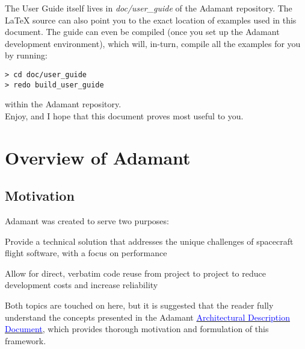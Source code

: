 The User Guide itself lives in \textit{doc/user\_guide} of the Adamant repository. The \LaTeX{} source can also point you to the exact location of examples used in this document. The guide can even be compiled (once you set up the Adamant development environment), which will, in-turn, compile all the examples for you by running:

\vspace{5mm} %
\begin{verbatim}
> cd doc/user_guide
> redo build_user_guide
\end{verbatim}
\vspace{5mm} %

within the Adamant repository. \\

Enjoy, and I hope that this document proves most useful to you.

\newpage
\section{Overview of Adamant}

\subsection{Motivation}

Adamant was created to serve two purposes: 

\vspace{1mm} %
\begin{spacedenumerate}
  \item Provide a technical solution that addresses the unique challenges of spacecraft flight software, with a focus on performance
  \item Allow for direct, verbatim code reuse from project to project to reduce development costs and increase reliability
\end{spacedenumerate}
\vspace{1mm} %

Both topics are touched on here, but it is suggested that the reader fully understand the concepts presented in the Adamant \href{https://github.com/lasp/adamant/blob/main/doc/architecture_description_document/architecture_description_document.pdf}{\textcolor{blue}{Architectural Description Document}}, which provides thorough motivation and formulation of this framework. \\

